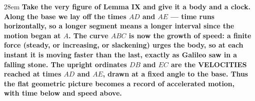 \documentclass[border=4pt]{standalone}
\begin{document}
\begin{varwidth}{28em}
\large\bfseries
Take the very figure of Lemma IX and give it a body and a clock. Along the base we lay off      the times $AD$ and $AE$ — time runs horizontally, so a longer segment means a      longer interval since the motion began at $A$. The curve $ABC$ is now the growth of speed:      a finite force (steady, or increasing, or slackening) urges the body, so at each instant it      is moving faster than the last, exactly as Galileo saw in a falling stone. The upright      ordinates $DB$ and $EC$ are the VELOCITIES reached at times $AD$ and $AE$, drawn      at a fixed angle to the base. Thus the flat geometric picture becomes a record of accelerated      motion, with time below and speed above.
\end{varwidth}
\end{document}
